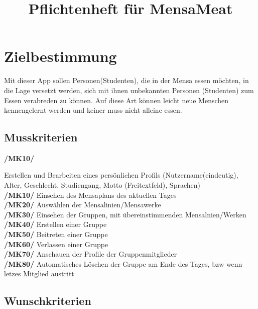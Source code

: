 \documentclass[a4paper]{scrreprt}
\begin{document}
\title{Pflichtenheft für MensaMeat}

\maketitle
 
\tableofcontents
 
\chapter{Zielbestimmung}
Mit dieser App sollen Personen(Studenten), die in der Mensa essen möchten, in die Lage versetzt werden, sich mit ihnen unbekannten Personen (Studenten) zum Essen verabreden zu können. Auf diese Art können leicht neue Menschen kennengelernt werden und keiner muss nicht alleine essen.
 
\section{Musskriterien}

\begin{addmargin}[25pt]{0pt} 
\hypertarget{mk10}{\textbf{/MK10/}} Erstellen und Bearbeiten eines persönlichen Profils (Nutzername(eindeutig), Alter, Geschlecht, Studiengang, Motto (Freitextfeld), Sprachen)\\
\hypertarget{mk10}{\textbf{/MK10/}} Einsehen des Mensaplans des aktuellen Tages\\
\hypertarget{mk20}{\textbf{/MK20/}} Auswählen der Mensalinien/Mensawerke\\
\hypertarget{mk30}{\textbf{/MK30/}} Einsehen der Gruppen, mit übereinstimmenden Mensalnien/Werken\\
\hypertarget{mk40}{\textbf{/MK40/}} Erstellen einer Gruppe\\
\hypertarget{mk50}{\textbf{/MK50/}} Beitreten einer Gruppe\\
\hypertarget{mk60}{\textbf{/MK60/}} Verlassen einer Gruppe\\
\hypertarget{mk70}{\textbf{/MK70/}} Anschauen der Profile der Gruppenmitglieder\\
\hypertarget{mk80}{\textbf{/MK80/}} Automatisches Löschen der Gruppe am Ende des Tages, bzw wenn letzes Mitglied austritt\\
\end{addmargin}

\section{Wunschkriterien}
\end{document}
